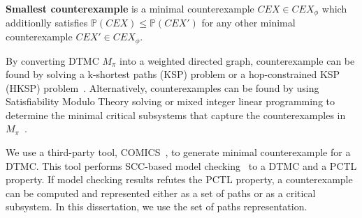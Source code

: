 \begin{definition}
\textbf{Smallest counterexample} is a minimal counterexample $CEX\in CEX_{\phi}$ which additionlly satisfies $\mathbb{P}(CEX)\leq \mathbb{P}(CEX')$ for any other minimal counterexample $CEX'\in CEX_{\phi}$.
\end{definition}

By converting DTMC $M_\pi$ into a weighted directed graph, counterexample can be found by solving a k-shortest paths (KSP) problem or 
a hop-constrained KSP (HKSP) problem~\cite{4770111}. 
Alternatively, counterexamples can be found by using Satisfiability Modulo Theory solving or mixed integer linear programming to 
determine the minimal critical subsystems that capture the counterexamples in $M_\pi$~\cite{Wimmer2012}. 

We use a third-party tool, COMICS~\cite{DBLP:journals/corr/abs-1206-0603}, to generate minimal counterexample for a DTMC. This tool performs SCC-based model checking~\cite{unknown} to a DTMC and a PCTL property. If model checking results refutes the PCTL property, a counterexample can be computed and represented either as a set of paths or as a critical subsystem. In this dissertation, we use the set of paths representation.



